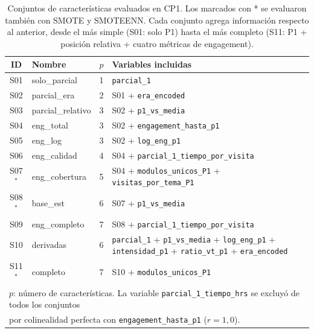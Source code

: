 \documentclass[12pt, letterpaper, openany]{report}
\begin{document}
\begin{table}[htbp]
  \centering
  \caption{Conjuntos de características evaluados en CP1. Los marcados con * se evaluaron también con SMOTE y SMOTEENN. Cada conjunto agrega información respecto al anterior, desde el más simple (S01: solo P1) hasta el más completo (S11: P1 + posición relativa + cuatro métricas de engagement).}
  \label{tab:feature_sets_cp1}
  \small
  \begin{tabular}{clcp{7cm}}
    \toprule
    ID & Nombre & $p$ & Variables incluidas \\
    \midrule
    S01 & solo\_parcial     & 1 & \texttt{parcial\_1} \\
    S02 & parcial\_era      & 2 & S01 + \texttt{era\_encoded} \\
    S03 & parcial\_relativo & 3 & S02 + \texttt{p1\_vs\_media} \\
    S04 & eng\_total        & 3 & S02 + \texttt{engagement\_hasta\_p1} \\
    S05 & eng\_log          & 3 & S02 + \texttt{log\_eng\_p1} \\
    S06 & eng\_calidad      & 4 & S04 + \texttt{parcial\_1\_tiempo\_por\_visita} \\
    S07$^*$ & eng\_cobertura & 5 & S04 + \texttt{modulos\_unicos\_P1} + \texttt{visitas\_por\_tema\_P1} \\
    S08$^*$ & base\_est     & 6 & S07 + \texttt{p1\_vs\_media} \\
    S09 & eng\_completo     & 7 & S08 + \texttt{parcial\_1\_tiempo\_por\_visita} \\
    S10 & derivadas         & 6 & \texttt{parcial\_1} + \texttt{p1\_vs\_media} + \texttt{log\_eng\_p1} + \texttt{intensidad\_p1} + \texttt{ratio\_vt\_p1} + \texttt{era\_encoded} \\
    S11$^*$ & completo      & 7 & S10 + \texttt{modulos\_unicos\_P1} \\
    \bottomrule
    \multicolumn{4}{l}{\footnotesize $p$: número de características. La variable \texttt{parcial\_1\_tiempo\_hrs} se excluyó de todos los conjuntos} \\
    \multicolumn{4}{l}{\footnotesize por colinealidad perfecta con \texttt{engagement\_hasta\_p1} ($r = 1{,}0$).} \\
  \end{tabular}
\end{table}
\end{document}
